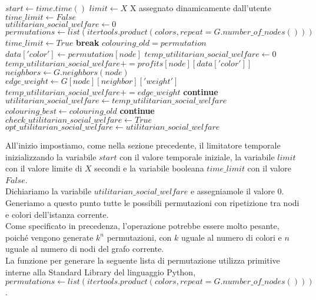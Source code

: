 \newpage
\begin{algorithmic}

\State $start\gets time.time()$
\State $limit\gets X$ \Comment X assegnato dinamicamente dall'utente
\State $time\_limit\gets False$ \\

\State $utilitarian\_social\_welfare\gets 0$
\State $permutations\gets list(itertools.product(colors, repeat=G.number\_of\_nodes()))$ \\

		\State $time\_limit\gets True$ 
		\State \textbf{break}
	\EndIf
	\State $colouring\_old = permutation$
		\State $data['color']\gets permutation[node]$
	\EndFor
	\State $temp\_utilitarian\_social\_welfare\gets 0$
		\State $temp\_utilitarian\_social\_welfare += profits[node][data['color']]$
		\State $neighbors\gets G.neighbors(node)$
				\State $edge\_weight\gets G[node][neighbor]['weight']$
				\State $temp\_utilitarian\_social\_welfare += edge\_weight$
			\Else
				\State \textbf{continue}
			\EndIf
		\EndFor
	\EndFor
		\State $utilitarian\_social\_welfare\gets temp\_utilitarian\_social\_welfare$
		\State $colouring\_best\gets colouring\_old$
	\Else
		\State \textbf{continue}
	\EndIf
\EndFor \\

	\State $check\_utilitarian\_social\_welfare\gets True$
	\State $opt\_utilitarian\_social\_welfare\gets utilitarian\_social\_welfare$
\EndIf 

\end{algorithmic} 

\newpage
All'inizio impostiamo, come nella sezione precedente, il limitatore temporale inizializzando la variabile $start$ con il valore temporale iniziale, la variabile $limit$ con il valore limite di $X$ secondi e la variabile booleana $time\_limit$ con il valore $False$.\\

Dichiariamo la variabile $utilitarian\_social\_welfare$ e assegniamole il valore $0$.\\
Generiamo a questo punto tutte le possibili permutazioni con ripetizione tra nodi e colori dell'istanza corrente.\\
Come specificato in precedenza, l'operazione potrebbe essere molto pesante, poiché vengono generate \(k^n\) permutazioni, con $k$ uguale al numero di colori e $n$ uguale al numero di nodi del grafo corrente.\\
La funzione per generare la seguente lista di permutazione utilizza primitive interne alla Standard Library del linguaggio Python, $permutations\gets list(itertools.product(colors, repeat=G.number\_of\_nodes()))$.\\

